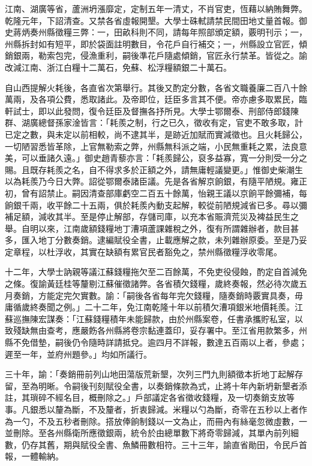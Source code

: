 \begin{pinyinscope}
江南、湖廣等省，蘆洲坍漲靡定，定制五年一清丈，不肖官吏，恆藉以納賄舞弊。乾隆元年，下詔清查。又禁各省虛報開墾。大學士硃軾請禁民間田地丈量首報。御史蔣炳奏州縣徵糧三弊：一，田畝科則不同，請每年照部頒定額，覈明刊示；一，州縣拆封如有短平，即於袋面註明數目，令花戶自行補交；一，州縣設立官匠，傾銷銀兩，勒索包完，侵漁重利，嗣後準花戶隨處傾銷，官匠永行禁革。皆從之。諭改減江南、浙江白糧十二萬石，免蘇、松浮糧額銀二十萬石。

自山西提解火耗後，各直省次第舉行。其後又酌定分數，各省文職養廉二百八十餘萬兩，及各項公費，悉取諸此。及帝即位，廷臣多言其不便。帝亦慮多取累民，臨軒試士，即以此發問，復令廷臣及督撫各抒所見。大學士鄂爾泰、刑部侍郎錢陳群、湖廣總督孫家淦皆言：「耗羨之制，行之已久，徵收有定，官吏不敢多取，計已定之數，與未定以前相較，尚不逮其半，是跡近加賦而實減徵也。且火耗歸公，一切陋習悉皆革除，上官無勒索之弊，州縣無科派之端，小民無重耗之累，法良意美，可以垂諸久遠。」御史趙青藜亦言：「耗羨歸公，裒多益寡，寬一分則受一分之賜。且既存耗羨之名，自不得求多於正額之外，請無庸輕議變更。」惟御史柴潮生以為耗羨乃今日大弊。詔從鄂爾泰諸臣議。先是各省解京餉銀，有隨平陋規。雍正初，曾有詔禁止。嗣因清查部庫虧空二百五十餘萬，怡親王議以京餉平餘彌補，每餉銀千兩，收平餘二十五兩，俱於耗羨內動支起解，較從前陋規減省已多。尋以彌補足額，減收其半。至是停止解部，存儲司庫，以充本省賑濟荒災及裨益民生之舉。自明以來，江南歲額錢糧地丁漕項蘆課雜稅之外，復有所謂雜辦者，款目甚多，匯入地丁分數奏銷。逮編賦役全書，止載應解之款，未列雜辦原委。至是乃妥定章程，以杜浮收，其實在缺額有累官民者豁免之，禁州縣徵糧浮收零尾。

十二年，大學士訥親等議江蘇錢糧拖欠至二百餘萬，不免吏役侵蝕，酌定自首減免之條。復諭黃廷桂等釐剔江蘇催徵諸弊。各省積欠錢糧，歲終奏報，然必待次歲五月奏銷，方能定完欠實數。諭：「嗣後各省每年完欠錢糧，隨奏銷時覈實具奏，毋庸循歲終奏聞之例。」二十二年，免江南乾隆十年以前積欠漕項銀米地價耗羨。江蘇巡撫陳宏謀奏：「江蘇錢糧積年未能歸款，由於州縣案卷，任書承攜貯私室，以致殘缺無由查考，應嚴飭各州縣將卷宗黏連蓋印，妥存署中。至江省用款繁多，州縣不免借墊，嗣後仍令隨時詳請抵兌。逾四月不詳報，數達五百兩以上者，參處；遲至一年，並府州題參。」均如所議行。

三十年，諭：「奏銷冊前列山地田蕩版荒新墾，次列三門九則額徵本折地丁起解存留，至為明晰。令嗣後刊刻賦役全書，以奏銷條款為式，止將十年內新坍新墾者添註，其瑣碎不經名目，概刪除之。」戶部議定各省徵收錢糧，及一切奏銷支放等事。凡銀悉以釐為斷，不及釐者，折衷歸減。米糧以勺為斷，奇零在五秒以上者作為一勺，不及五秒者刪除。搭放俸餉制錢以一文為止，而冊內有絲毫忽微虛數，一並刪除。至各州縣衛所應徵銀兩，統令於由總單數下將奇零歸減，其單內前列細數，仍存其舊，期與賦役全書、魚鱗冊數相符。三十三年，諭直省勛田，令民戶首報，一體輸納。


\end{pinyinscope}
